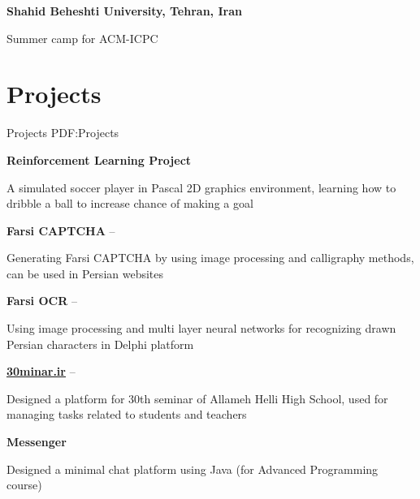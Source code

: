 \documentclass[a4paper,10pt,oneside]{article}
\begin{document}
\begin{body}
\EntryGap
{\textbf{Shahid Beheshti University, Tehran, Iran}}
\hfill
{}
\par
Summer camp for ACM-ICPC
\begin{detail}
\end{detail}


\section
{Projects}
{Projects}
{PDF:Projects}

{\textbf{Reinforcement Learning Project}}
\hfill
{}
\par
A simulated soccer player in Pascal 2D graphics environment, learning how to dribble a ball to increase chance of making a goal
\begin{detail}
\end{detail}

\EntryGap
{\textbf{Farsi CAPTCHA}}
\hfill
{} --
\par
Generating Farsi CAPTCHA by using image processing and calligraphy methods, can be used in Persian websites
\begin{detail}
\end{detail}

\EntryGap
{\textbf{Farsi OCR}}
\hfill
{} --
\par
Using image processing and multi layer neural networks for recognizing drawn Persian characters in Delphi platform
\begin{detail}
\end{detail}

\EntryGap
{\textbf{\href{http://30minar.ir}{30minar.ir}}}
\hfill
{} --
\par
Designed a platform for 30th seminar of Allameh Helli High School, used for managing tasks related to students and teachers
\begin{detail}
\end{detail}

\EntryGap
{\textbf{Messenger}}
\hfill
{}
\par
Designed a minimal chat platform using Java (for Advanced Programming course)
\begin{detail}
\end{detail}



\end{body}
\end{document}
